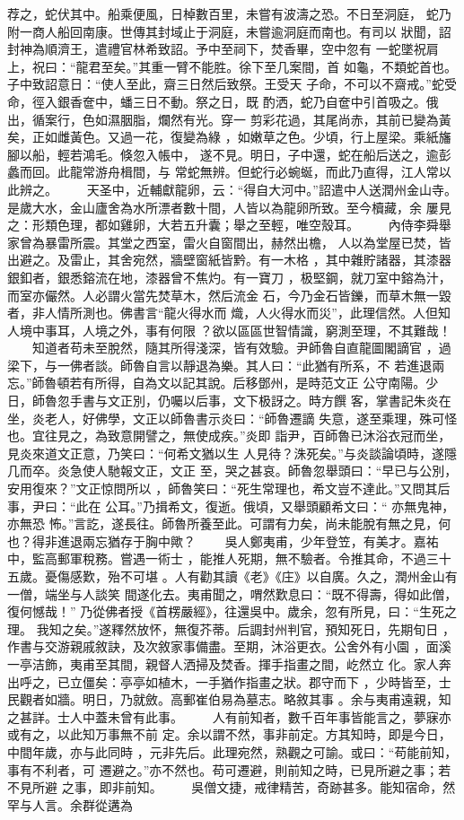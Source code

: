 \documentclass{ctexart}
\begin{document}
荐之，蛇伏其中。船乘便風，日棹數百里，未嘗有波濤之恐。不日至洞庭， 蛇乃附一商人船回南康。世傳其封域止于洞庭，未嘗逾洞庭而南也。有司以 狀聞，詔封神為順濟王，遣禮官林希致詔。予中至祠下，焚香畢，空中忽有 一蛇墜祝肩上，祝曰：``龍君至矣。''其重一臂不能胜。徐下至几案間，首 如龜，不類蛇首也。子中致詔意日：``使人至此，齋三日然后致祭。王受天 子命，不可以不齋戒。''蛇受命，徑入銀香奩中，蟠三日不動。祭之日，既 酌洒，蛇乃自奩中引首吸之。俄出，循案行，色如濕胭脂，爛然有光。穿一 剪彩花過，其尾尚赤，其前已變為黃矣，正如雌黃色。又過一花，復變為綠 ，如嫩草之色。少頃，行上屋梁。乘紙旛腳以船，輕若鴻毛。倏忽入帳中， 遂不見。明日，子中還，蛇在船后送之，逾彭蠡而回。此龍常游舟楫間，与 常蛇無辨。但蛇行必蜿蜒，而此乃直得，江人常以此辨之。 　　天圣中，近輔獻龍卵，云：``得自大河中。''詔遣中人送潤州金山寺。 是歲大水，金山廬舍為水所漂者數十間，人皆以為龍卵所致。至今櫝藏，余 屢見之：形類色理，都如雞卵，大若五升囊；舉之至輕，唯空殼耳。 　　內侍李舜舉家曾為暴雷所震。其堂之西室，雷火自窗間出，赫然出檐， 人以為堂屋已焚，皆出避之。及雷止，其舍宛然，牆壁窗紙皆黔。有一木格 ，其中雜貯諸器，其漆器銀釦者，銀悉鎔流在地，漆器曾不焦灼。有一寶刀 ，极堅鋼，就刀室中鎔為汁，而室亦儼然。人必謂火當先焚草木，然后流金 石，今乃金石皆鑠，而草木無一毀者，非人情所測也。佛書言``龍火得水而 熾，人火得水而災''，此理信然。人但知人境中事耳，人境之外，事有何限 ？欲以區區世智情識，窮測至理，不其難哉！ 　　知道者苟未至脫然，隨其所得淺深，皆有效驗。尹師魯自直龍圖閣謫官 ，過梁下，与一佛者談。師魯自言以靜退為樂。其人曰：``此猶有所系，不 若進退兩忘。''師魯頓若有所得，自為文以記其說。后移鄧州，是時范文正 公守南陽。少日，師魯忽手書与文正別，仍囑以后事，文下极訝之。時方饌 客，掌書記朱炎在坐，炎老人，好佛學，文正以師魯書示炎曰：``師魯遷謫 失意，遂至乘理，殊可怪也。宜往見之，為致意開譬之，無使成疾。''炎即 詣尹，百師魯已沐浴衣冠而坐，見炎來道文正意，乃笑曰：``何希文猶以生 人見待？洙死矣。''与炎談論頃時，遂隱几而卒。炎急使人馳報文正，文正 至，哭之甚哀。師魯忽舉頭曰：``早已与公別，安用復來？''文正惊問所以 ，師魯笑曰：``死生常理也，希文豈不達此。''又問其后事，尹曰：``此在 公耳。''乃揖希文，復逝。俄頃，又舉頭顧希文曰：`` 亦無鬼神，亦無恐 怖。''言訖，遂長往。師魯所養至此。可謂有力矣，尚未能脫有無之見，何 也？得非進退兩忘猶存于胸中歟？ 　　吳人鄭夷甫，少年登笠，有美才。嘉祐中，監高郵軍稅務。嘗遇一術士 ，能推人死期，無不驗者。令推其命，不過三十五歲。憂傷感歎，殆不可堪 。人有勸其讀《老》《庄》以自廣。久之，潤州金山有一僧，端坐与人談笑 間遂化去。夷甫聞之，喟然歎息曰：``既不得壽，得如此僧，復何憾哉！'' 乃從佛者授《首楞嚴經》，往還吳中。歲余，忽有所見，曰：``生死之理。 我知之矣。''遂釋然放怀，無復芥蒂。后調封州判官，預知死日，先期旬日 ，作書与交游親戚敘訣，及次敘家事備盡。至期，沐浴更衣。公舍外有小園 ，面溪一亭洁飾，夷甫至其間，親督人洒掃及焚香。揮手指畫之間，屹然立 化。家人奔出呼之，已立僵矣：亭亭如植木，一手猶作指畫之狀。郡守而下 ，少時皆至，士民觀者如牆。明日，乃就斂。高郵崔伯易為墓志。略敘其事 。余与夷甫遠親，知之甚詳。士人中蓋未曾有此事。 　　人有前知者，數千百年事皆能言之，夢寐亦或有之，以此知万事無不前 定。余以謂不然，事非前定。方其知時，即是今日，中間年歲，亦与此同時 ，元非先后。此理宛然，熟觀之可諭。或曰：``苟能前知，事有不利者，可 遷避之。''亦不然也。苟可遷避，則前知之時，已見所避之事；若不見所避 之事，即非前知。 　　吳僧文捷，戒律精苦，奇跡甚多。能知宿命，然罕与人言。余群從遘為 
\end{document}
